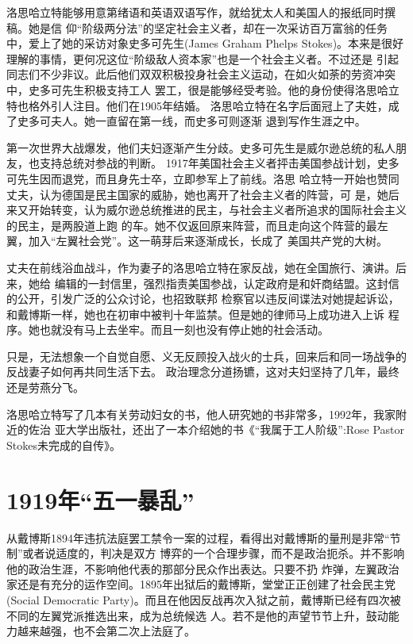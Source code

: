 \documentclass[10pt]{article}
\begin{document}
{洛思\textperiodcentered 哈立特能够用意第绪语和英语双语写作，就给犹太人和美国人的报纸同时撰稿。她是信
仰``阶级两分法''的坚定社会主义者，却在一次采访百万富翁的任务中，爱上了她的采访对象史多可先生(James
Graham Phelps Stokes)。本来是很好理解的事情，更何况这位``阶级敌人资本家''也是一个社会主义者。不过还是
引起同志们不少非议。此后他们双双积极投身社会主义运动，在如火如荼的劳资冲突中，史多可先生积极支持工人
罢工，很是能够经受考验。他的身份使得洛思\textperiodcentered 哈立特也格外引人注目。他们在1905年结婚。
洛思\textperiodcentered 哈立特在名字后面冠上了夫姓，成了史多可夫人。她一直留在第一线，而史多可则逐渐
退到写作生涯之中。

第一次世界大战爆发，他们夫妇逐渐产生分歧。史多可先生是威尔逊总统的私人朋友，也支持总统对参战的判断。
1917年美国社会主义者抨击美国参战计划，史多可先生因而退党，而且身先士卒，立即参军上了前线。洛思
\textperiodcentered 哈立特一开始也赞同丈夫，认为德国是民主国家的威胁，她也离开了社会主义者的阵营，可
是，她后来又开始转变，认为威尔逊总统推进的民主，与社会主义者所追求的国际社会主义的民主，是两股道上跑
的车。她不仅返回原来阵营，而且走向这个阵营的最左翼，加入``左翼社会党''。这一萌芽后来逐渐成长，长成了
美国共产党的大树。

丈夫在前线浴血战斗，作为妻子的洛思\textperiodcentered 哈立特在家反战，她在全国旅行、演讲。后来，她给
编辑的一封信里，强烈指责美国参战，认定政府是和奸商结盟。这封信的公开，引发广泛的公众讨论，也招致联邦
检察官以违反间谍法对她提起诉讼，和戴博斯一样，她也在初审中被判十年监禁。但是她的律师马上成功进入上诉
程序。她也就没有马上去坐牢。而且一刻也没有停止她的社会活动。

只是，无法想象一个自觉自愿、义无反顾投入战火的士兵，回来后和同一场战争的反战妻子如何再共同生活下去。
政治理念分道扬镳，这对夫妇坚持了几年，最终还是劳燕分飞。

洛思\textperiodcentered 哈立特写了几本有关劳动妇女的书，他人研究她的书非常多，1992年，我家附近的佐治
亚大学出版社，还出了一本介绍她的书《``我属于工人阶级'':Rose Pastor Stokes未完成的自传》。

\pagebreak
\section{1919年``五一暴乱''}

从戴博斯1894年违抗法庭罢工禁令一案的过程，看得出对戴博斯的量刑是非常``节制''或者说适度的，判决是双方
博弈的一个合理步骤，而不是政治扼杀。并不影响他的政治生涯，不影响他代表的那部分民众作出表达。只要不扔
炸弹，左翼政治家还是有充分的运作空间。1895年出狱后的戴博斯，堂堂正正创建了社会民主党(Social
Democratic Party)。而且在他因反战再次入狱之前，戴博斯已经有四次被不同的左翼党派推选出来，成为总统候选
人。若不是他的声望节节上升，鼓动能力越来越强，也不会第二次上法庭了。

}
\end{document}
